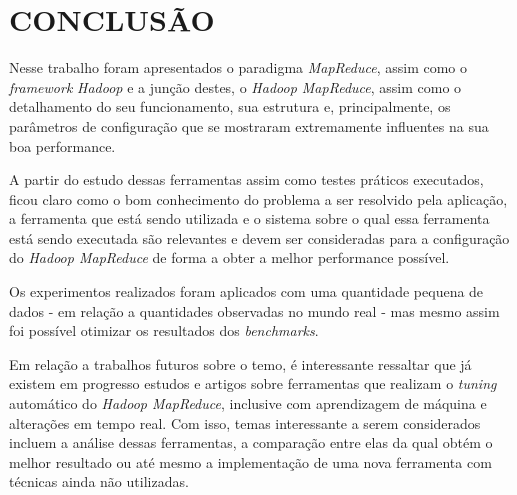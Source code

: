 \chapter{CONCLUSÃO} \label{cha:conclusao}

Nesse trabalho foram apresentados o paradigma \textit{MapReduce}, assim como o \textit{\gls{framework}} \textit{Hadoop} e a junção destes, o \textit{Hadoop MapReduce}, assim como o detalhamento do seu funcionamento, sua estrutura e, principalmente, os parâmetros de configuração que se mostraram extremamente influentes na sua boa performance.

A partir do estudo dessas ferramentas assim como testes práticos executados, ficou claro como o bom conhecimento do problema a ser resolvido pela aplicação, a ferramenta que está sendo utilizada e o sistema sobre o qual essa ferramenta está sendo executada são relevantes e devem ser consideradas para a configuração do \textit{Hadoop MapReduce} de forma a obter a melhor performance possível. 

Os experimentos realizados foram aplicados com uma quantidade pequena de dados - em relação a quantidades observadas no mundo real - mas mesmo assim foi possível otimizar os resultados dos \textit{\gls{benchmark}s}. 

Em relação a trabalhos futuros sobre o temo, é interessante ressaltar que já existem em progresso estudos e artigos sobre ferramentas que realizam o \textit{tuning} automático do \textit{Hadoop MapReduce}, inclusive com aprendizagem de máquina e alterações em tempo real. Com isso, temas interessante a serem considerados incluem a análise dessas ferramentas, a comparação entre elas da qual obtém o melhor resultado ou até mesmo a implementação de uma nova ferramenta com técnicas ainda não utilizadas.